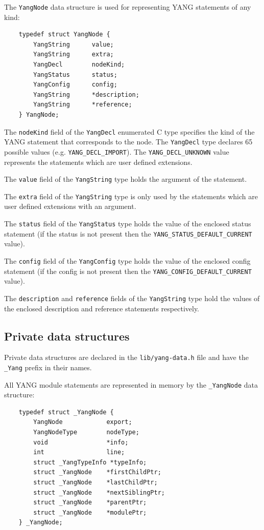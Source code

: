 \documentclass[conference]{IEEEtran}
\begin{document}
The \texttt{YangNode} data structure is used for representing YANG statements of any kind:
\small
\begin{center}
\begin{verbatim}
    typedef struct YangNode {
        YangString      value;
        YangString      extra;
        YangDecl        nodeKind;
        YangStatus      status;
        YangConfig      config;
        YangString      *description;
        YangString      *reference;
    } YangNode;
\end{verbatim}
\end{center}
\normalsize
The \texttt{nodeKind} field of the \texttt{YangDecl} enumerated C type specifies the kind of the YANG statement
that corresponds to the node. The \texttt{YangDecl} type declares 65 possible values (e.g. \texttt{YANG\_DECL\_IMPORT}). The \texttt{YANG\_DECL\_UNKNOWN} 
value represents the statements which are user defined extensions.

The \texttt{value} field of the \texttt{YangString} type holds the argument of the statement.

The \texttt{extra} field of the \texttt{YangString} type is only used by the statements which are user defined extensions with an argument.

The \texttt{status} field of the \texttt{YangStatus} type holds the value of the enclosed status statement (if the status is not present then the \texttt{YANG\_STATUS\_DEFAULT\_CURRENT} value).

The \texttt{config} field of the \texttt{YangConfig} type holds the value of the enclosed config statement (if the config is not present then the \texttt{YANG\_CONFIG\_DEFAULT\_CURRENT} value).

The \texttt{description} and \texttt{reference} fields of the \texttt{YangString} type hold the values of the enclosed description and reference statements respectively.

\subsection{Private data structures}
Private data structures are declared in the \texttt{lib/yang-data.h} file and have the \texttt{\_Yang} prefix in their names. 

All YANG module statements are represented in memory by the \texttt{\_YangNode} data structure:
\small
\begin{verbatim}
    typedef struct _YangNode {
        YangNode            export;
        YangNodeType        nodeType;
        void                *info;
        int                 line;
        struct _YangTypeInfo *typeInfo;
        struct _YangNode  	*firstChildPtr;
        struct _YangNode  	*lastChildPtr;    
        struct _YangNode  	*nextSiblingPtr;
        struct _YangNode  	*parentPtr;
        struct _YangNode  	*modulePtr;
    } _YangNode;
\end{verbatim}
\normalsize
\end{document}
